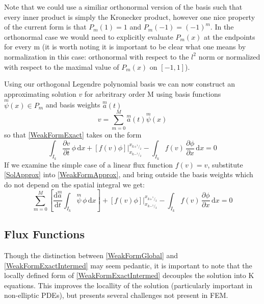 \documentclass[letterpaper]{article}
\begin{document}
Note that we could use a similiar orthonormal version of the basis such that every inner product is simply the Kronecker product, however one nice property of the current form is that $P_m(1)=1$ and $P_m(-1)=(-1)^m$. In the orthonormal case we would need to explicitly evaluate $P_m(x)$ at the endpoints for every m (it is worth noting it is important to be clear what one means by normalization in this case: orthonormal with respect to the $l^2$ norm or normalized with respect to the maximal value of $P_m(x)$ on $[-1,1]$).

Using our orthogonal Legendre polynomial basis we can now construct an approximating solution $v$ for arbritrary order M using basis functions $\overset{m}{\psi}(x) \in P_m$ and basis weights $\overset{m}{a}(t)$
\begin{equation}\label{SolApprox}
v = \sum_{m=0}^M \overset{m}{a}(t)\overset{m}{\psi}(x)
\end{equation}
so that \eqref{WeakFormExact} takes on the form
\begin{equation}\label{WeakFormApprox}
\int_{I_k}\! \frac{\partial v}{\partial t} \,\phi \,\mathrm{d}x + [f(v)\phi] \Big\rvert_{x_{k-^1\!/_2}}^{x_{k+^1\!/_2}} -  \int_{I_k}\! f(v) \,\frac{\partial \phi}{\partial x} \,\mathrm{d}x = 0
\end{equation}
If we examine the simple case of a linear flux function $f(v) = v$, substitute \eqref{SolApprox} into \eqref{WeakFormApprox}, and bring outside the basis weights which do not depend on the spatial integral we get:
\begin{equation}\label{WeakFormLinearIntermed}
\sum_{m=0}^M \left[ \frac{\mathrm{d}\overset{m}{a}}{\mathrm{d} t} \int_{I_k}\! \overset{m}{\psi} \,\phi \,\mathrm{d}x \right] + [f(v)\phi] \Big\rvert_{x_{k-^1\!/_2}}^{x_{k+^1\!/_2}} -  \int_{I_k}\! f(v) \,\frac{\partial \phi}{\partial x} \,\mathrm{d}x = 0
\end{equation}

\subsection{Flux Functions}
Though the distinction between \eqref{WeakFormGlobal} and \eqref{WeakFormExactIntermed} may seem pedantic, it is important to note that the locally defined form of \eqref{WeakFormExactIntermed} decouples the solution into K equations. This improves the locallity of the solution (particularly important in non-elliptic PDEs), but presents several challenges not present in FEM.
\end{document}
